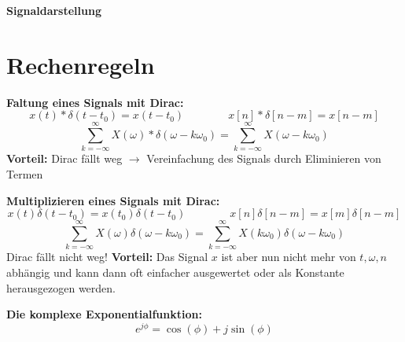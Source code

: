 \documentclass[a4paper,11pt]{article}
\begin{document}
\huge \textbf{Signaldarstellung}\large\nl

\vspace{-0.65cm}
\section*{Rechenregeln \large}

\textbf{Faltung eines Signals mit Dirac:}
$$x(t)\ast \delta(t-t_0)=x(t-t_0)\qquad\qquad x[n]\ast \delta[n-m]=x[n-m]$$
$$\displaystyle\sum_{k=-\infty}^{\infty}X(\omega)\ast \delta(\omega-k\omega_0)=\displaystyle\sum_{k=-\infty}^{\infty}X(\omega-k\omega_0)$$
\textbf{Vorteil:} Dirac fällt weg $\rightarrow$ Vereinfachung des Signals durch Eliminieren von Termen

\vspace{0.3cm}
\textbf{Multiplizieren eines Signals mit Dirac:}
$$x(t) \delta(t-t_0)=x(t_0)\delta(t-t_0)\qquad\qquad x[n] \delta[n-m]=x[m]\delta[n-m]$$
$$\displaystyle\sum_{k=-\infty}^{\infty}X(\omega) \delta(\omega-k\omega_0)=\displaystyle\sum_{k=-\infty}^{\infty}X(k\omega_0)\delta(\omega-k\omega_0)$$
Dirac fällt nicht weg! \textbf{Vorteil:} Das Signal $x$ ist aber nun nicht mehr von $t,\omega,n$ abhängig und kann dann oft einfacher ausgewertet oder als Konstante herausgezogen werden.

\vspace{0.3cm}
\textbf{Die komplexe Exponentialfunktion:}
$$e^{j\phi}=\cos(\phi)+j\sin(\phi)$$

\vspace{-0.5cm}
\begin{figure}[h!]
\centering
{}
\end{figure}
\end{document}
